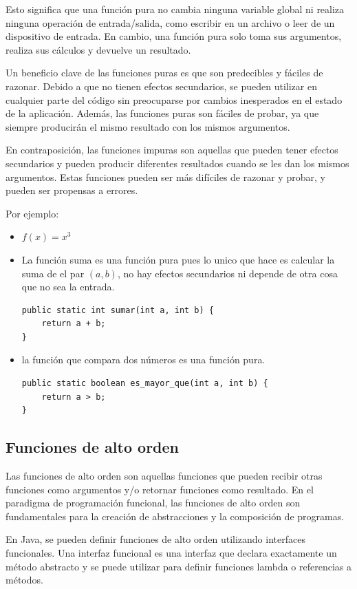 \documentclass[executivepaper]{article}
\begin{document}
Esto significa que una función pura no cambia ninguna variable global ni realiza ninguna operación de entrada/salida, como escribir en un archivo o leer de un dispositivo de entrada. En cambio, una función pura solo toma sus argumentos, realiza sus cálculos y devuelve un resultado.

Un beneficio clave de las funciones puras es que son predecibles y fáciles de razonar. Debido a que no tienen efectos secundarios, se pueden utilizar en cualquier parte del código sin preocuparse por cambios inesperados en el estado de la aplicación. Además, las funciones puras son fáciles de probar, ya que siempre producirán el mismo resultado con los mismos argumentos.

En contraposición, las funciones impuras son aquellas que pueden tener efectos secundarios y pueden producir diferentes resultados cuando se les dan los mismos argumentos. Estas funciones pueden ser más difíciles de razonar y probar, y pueden ser propensas a errores.

Por ejemplo:
\begin{itemize}
    \item $f(x) = x^{3}$
    
    \item La función suma es una función pura pues lo unico que hace es calcular la suma de el par $(a,b)$, no hay efectos secundarios ni depende de otra cosa que no sea la entrada.
\begin{lstlisting}
public static int sumar(int a, int b) {
    return a + b;
}
\end{lstlisting}
    \item la función que compara dos números es una función pura.
\begin{lstlisting}
public static boolean es_mayor_que(int a, int b) {
    return a > b;
}
\end{lstlisting}
\end{itemize}

\subsection{Funciones de alto orden}
Las funciones de alto orden son aquellas funciones que pueden recibir otras funciones como argumentos y/o retornar funciones como resultado. En el paradigma de programación funcional, las funciones de alto orden son fundamentales para la creación de abstracciones y la composición de programas.

En Java, se pueden definir funciones de alto orden utilizando interfaces funcionales. Una interfaz funcional es una interfaz que declara exactamente un método abstracto y se puede utilizar para definir funciones lambda o referencias a métodos.
\end{document}
